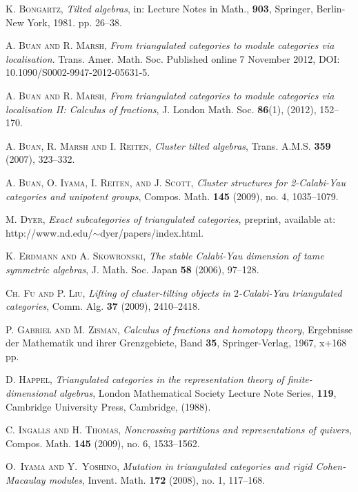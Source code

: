 \documentclass[oneside, a4paper,reqno]{amsart}
\numberwithin{equation}{section}
\theoremstyle{definition}
\begin{document}
\begin{thebibliography}{99}
\textsc{K. Bongartz}, {\em Tilted algebras},  in: Lecture Notes in Math., {\bf 903}, Springer, Berlin-New York, 1981. pp. 26--38.
 

\textsc{A. Buan and R. Marsh}, \textit{From triangulated categories to module categories via localisation}. Trans. Amer. Math. Soc. Published online 7 November 2012, DOI: 10.1090/S0002-9947-2012-05631-5.

\textsc{A. Buan and R. Marsh}, \textit{From triangulated categories to module categories via localisation II: Calculus of fractions}, J. London Math. Soc. {\bf 86}(1), (2012), 152--170. 

\textsc{A. Buan, R. Marsh and I. Reiten}, {\em Cluster tilted algebras}, Trans. A.M.S. {\bf 359} (2007),  323--332.
  

\textsc{A. Buan, O. Iyama, I.  Reiten, and J. Scott}, {\em 
Cluster structures for 2-Calabi-Yau categories and unipotent groups},  
Compos. Math. {\bf 145} (2009), no. 4, 1035--1079. 

\textsc{M. Dyer}, {\em Exact subcategories of triangulated categories}, preprint, available at: \textsf{http://www.nd.edu/\!$\sim$dyer/papers/index.html}. 

\textsc{K. Erdmann and A. Skowronski}, {\em The stable Calabi-Yau dimension of tame symmetric algebras}, J. Math.  Soc.  Japan {\bf 58} (2006), 97--128. 

\textsc{Ch. Fu and P. Liu}, {\em Lifting of cluster-tilting objects in $2$-Calabi-Yau triangulated categories}, Comm. Alg. {\bf 37} (2009), 2410--2418.

\textsc{P. Gabriel and M. Zisman}, {\em Calculus of fractions and homotopy theory}, Ergebnisse der Mathematik
und ihrer Grenzgebiete, Band {\bf 35},  Springer-Verlag, 1967, x+168 pp. 

\textsc{D. Happel}, {\em Triangulated categories in the representation theory of finite-dimensional
algebras}, London Mathematical Society Lecture Note Series, {\bf 119}, Cambridge University
Press, Cambridge, (1988).

\textsc{C. Ingalls and H. Thomas}, {\em Noncrossing partitions and representations of quivers}, Compos. Math. {\bf 145} (2009), no. 6, 1533--1562.

\textsc{O.~Iyama and Y.~Yoshino}, \textit{Mutation in triangulated categories and rigid Cohen-Macaulay modules}, Invent. Math. {\bf 172} (2008), no. 1, 117--168.


\end{thebibliography}
\end{document}
